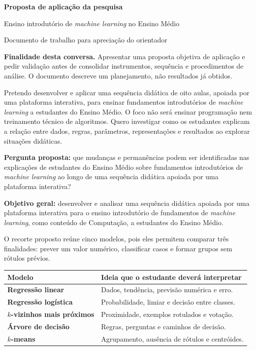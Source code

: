 \documentclass[11pt,a4paper]{article}
\newcommand{\titulo}[1]{\vspace{7pt}{\large\bfseries\color{azul}#1}\par\vspace{2pt}}
\newcommand{\caixa}[1]{\begingroup\setlength{\fboxsep}{8pt}\colorbox{azulclaro}{\parbox{\dimexpr\linewidth-2\fboxsep\relax}{#1}}\endgroup}
\begin{document}
\begin{center}
  {\LARGE\bfseries\color{azul} Proposta de aplicação da pesquisa}\par
  \vspace{3pt}
  {\large Ensino introdutório de \textit{machine learning} no Ensino Médio}\par
  \vspace{5pt}
  \small Documento de trabalho para apreciação do orientador
\end{center}

\caixa{\textbf{Finalidade desta conversa.} Apresentar uma proposta objetiva de aplicação e pedir validação antes de consolidar instrumentos, sequência e procedimentos de análise. O documento descreve um planejamento, não resultados já obtidos.}

\titulo{1. Ideia central}

Pretendo desenvolver e aplicar uma sequência didática de oito aulas, apoiada por uma plataforma interativa, para ensinar fundamentos introdutórios de \textit{machine learning} a estudantes do Ensino Médio. O foco não será ensinar programação nem treinamento técnico de algoritmos. Quero investigar como os estudantes explicam a relação entre dados, regras, parâmetros, representações e resultados ao explorar situações didáticas.

\textbf{Pergunta proposta:} que mudanças e permanências podem ser identificadas nas explicações de estudantes do Ensino Médio sobre fundamentos introdutórios de \textit{machine learning} ao longo de uma sequência didática apoiada por uma plataforma interativa?

\textbf{Objetivo geral:} desenvolver e analisar uma sequência didática apoiada por uma plataforma interativa para o ensino introdutório de fundamentos de \textit{machine learning}, como conteúdo de Computação, a estudantes do Ensino Médio.

\titulo{2. O que pretendo ensinar}

O recorte proposto reúne cinco modelos, pois eles permitem comparar três finalidades: prever um valor numérico, classificar casos e formar grupos sem rótulos prévios.

\begin{center}
\small
\begin{tabularx}{\textwidth}{>{\bfseries}p{4cm} X}
\toprule
Modelo & Ideia que o estudante deverá interpretar \\
\midrule
Regressão linear & Dados, tendência, previsão numérica e erro. \\
Regressão logística & Probabilidade, limiar e decisão entre classes. \\
$k$-vizinhos mais próximos & Proximidade, exemplos rotulados e votação. \\
Árvore de decisão & Regras, perguntas e caminhos de decisão. \\
$k$-means & Agrupamento, ausência de rótulos e centróides. \\
\bottomrule
\end{tabularx}
\end{center}
\end{document}
